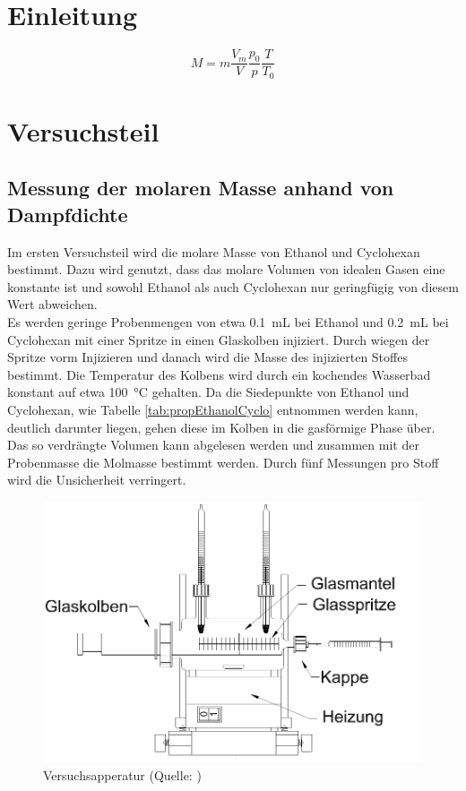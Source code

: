 \section{Einleitung}

\begin{equation}
	M = m \frac{V_m}{V}\frac{p_0}{p}\frac{T}{T_0} \label{eq:dampfMolMasse}
\end{equation}

\section{Versuchsteil}
\subsection{Messung der molaren Masse anhand von Dampfdichte}
Im ersten Versuchsteil wird die molare Masse von Ethanol und Cyclohexan bestimmt. Dazu wird genutzt, dass das molare Volumen von idealen Gasen eine konstante ist und sowohl Ethanol als auch Cyclohexan nur geringfügig von diesem Wert abweichen. \\
Es werden geringe Probenmengen von etwa \SI{.1}{\milli\liter} bei Ethanol und \SI{.2}{\milli\liter} bei Cyclohexan mit einer Spritze in einen Glaskolben injiziert. Durch wiegen der Spritze vorm Injizieren und danach wird die Masse des injizierten Stoffes bestimmt. Die Temperatur des Kolbens wird durch ein kochendes Wasserbad konstant auf etwa \SI{100}{\degreeCelsius} gehalten. Da die Siedepunkte von Ethanol und Cyclohexan, wie Tabelle \ref{tab:propEthanolCyclo} entnommen werden kann, deutlich darunter liegen, gehen diese im Kolben in die gasförmige Phase über. Das so verdrängte Volumen kann abgelesen werden und zusammen mit der Probenmasse die Molmasse bestimmt werden. Durch fünf Messungen pro Stoff wird die Unsicherheit verringert.
\begin{figure}[H]
\centering
\includegraphics[width=.7\textwidth]{Bilder/aufbau_dampf.png}
\caption[Aufbau]{Versuchsapperatur (Quelle: \cite{anleitung2015})}
\label{fig:aufbau_dampf}
\end{figure}
